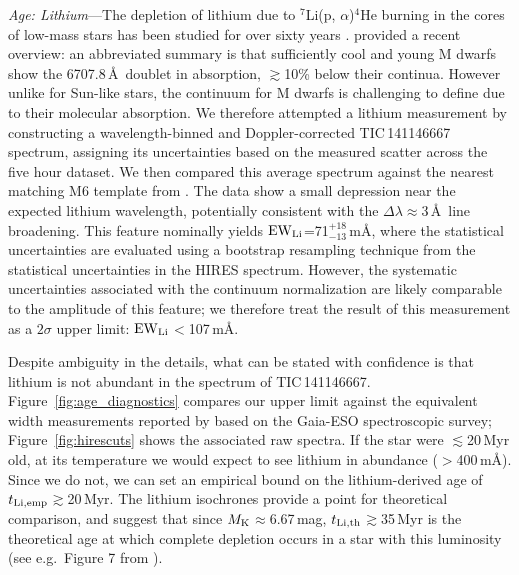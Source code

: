 \documentclass[11pt,twocolumn,tighten,linenumbers]{aastex7}
\begin{document}
{\it Age: Lithium}---The depletion of lithium due to $^7$Li(p,
$\alpha$)$^4$He burning in the cores of low-mass stars has been
studied for over sixty years
\citep{Hayashi1963,Bildsten1997,Burke2004}.  \citet{Wood2023} provided a
recent overview: an abbreviated summary is that sufficiently cool and
young M dwarfs show the 6707.8\,\AA\ doublet in absorption,
$\gtrsim$10\% below their continua.  However unlike for Sun-like
stars, the continuum for M dwarfs is challenging to define due to
their molecular absorption.  We therefore attempted a lithium
measurement by constructing a wavelength-binned and Doppler-corrected
TIC\,141146667 spectrum, assigning its uncertainties based on the
measured scatter across the five hour dataset.  We then compared this
average spectrum against the nearest matching M6 template from
\citet{Bochanski2007}.  The data show a small depression near the
expected lithium wavelength, potentially consistent with the $\Delta
\lambda$$\approx$3\,\AA\ line broadening.  This feature nominally
yields ${\rm EW}_{\rm Li}$=71$^{+18}_{-13}$\,m\AA, where the
statistical uncertainties are evaluated using a bootstrap resampling
technique from the statistical uncertainties in the HIRES spectrum.
However, the systematic uncertainties associated with the continuum
normalization are likely comparable to the amplitude of this feature;
we therefore treat the result of this measurement as a $2\sigma$ upper
limit: ${\rm EW}_{\rm Li}$$<$107\,m\AA.


Despite ambiguity in the details, what can be stated with
confidence is that lithium is not abundant in the spectrum of
TIC\,141146667.  Figure~\ref{fig:age_diagnostics}
compares our upper limit against the equivalent width measurements
reported by \citet{Jeffries2023} based on the Gaia-ESO spectroscopic
survey; Figure~\ref{fig:hirescuts} shows the associated
raw spectra.  If the star were $\lesssim$20\,Myr old, at its
temperature we would expect to see lithium in abundance
($>$400\,m\AA).  Since we do not, we can set an empirical bound on the
lithium-derived age of $t_{\rm Li,emp}$$\gtrsim$20\,Myr.  The
\citet{Feiden2016} lithium isochrones provide a point for theoretical
comparison, and suggest that since $M_{\rm K}$$\approx$6.67\,mag,
$t_{\rm Li,th}$$\gtrsim$35\,Myr is the theoretical age at which
complete depletion occurs in a star with this luminosity (see
e.g.~Figure 7 from \citealt{Wood2023}).
\end{document}
